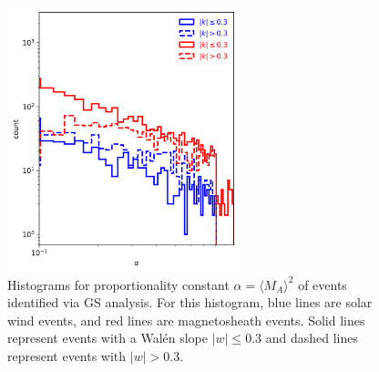 \begin{figure}
    \centering
    \includegraphics[width=0.6\textwidth]{Figures/Histograms/histogram_alpha.png}
    \caption{Histograms for proportionality constant $\alpha = \langle M_A \rangle^2$ of events identified via GS analysis. For this histogram, blue lines are solar wind events, and red lines are magnetosheath events. Solid lines represent events with a Wal\'en slope $|w|\leq 0.3$ and dashed lines represent events with $|w|> 0.3$.}
    \label{fig:histogram-alpha}
\end{figure}



